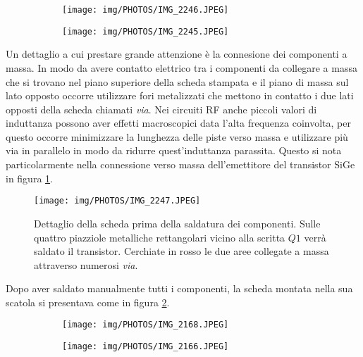 \documentclass[12pt,oneside]{book}
\begin{document}
\begin{figure}[!htbp]
    \centering
    \begin{subfigure}[t]{0.48\textwidth}
        \centering
        \texttt{[image: img/PHOTOS/IMG\_2246.JPEG]}
        \caption{}
    \end{subfigure}
    \hfill
    \begin{subfigure}[t]{0.48\textwidth}
        \centering
        \texttt{[image: img/PHOTOS/IMG\_2245.JPEG]}
        \caption{}
    \end{subfigure}
    \caption{}
\end{figure}

Un dettaglio a cui prestare grande attenzione è la connesione dei componenti a massa. In modo da avere contatto elettrico tra i componenti da collegare a massa che si trovano nel piano superiore della scheda stampata e il piano di massa sul lato opposto occorre utilizzare fori metalizzati che mettono in contatto i due lati opposti della scheda chiamati \textit{via}. Nei circuiti RF anche piccoli valori di induttanza possono aver effetti macroscopici data l'alta frequenza coinvolta, per questo occorre minimizzare la lunghezza delle piste verso massa e utilizzare più via in parallelo in modo da ridurre quest'induttanza parassita. Questo si nota particolarmente nella connessione verso massa dell'emettitore del transistor SiGe in figura \ref{sige_ground}.

\begin{figure}[!htbp]
    \centering

    \texttt{[image: img/PHOTOS/IMG\_2247.JPEG]}
    \caption{Dettaglio della scheda prima della saldatura dei componenti. Sulle quattro piazziole metalliche rettangolari vicino alla scritta $Q1$ verrà saldato il transistor. Cerchiate in rosso le due aree collegate a massa attraverso numerosi \textit{via}.}
    \label{sige_ground}
\end{figure}

Dopo aver saldato manualmente tutti i componenti, la scheda montata nella sua scatola si presentava come in figura \ref{scheda}.

\begin{figure}[!htbp]
    \centering
    \begin{subfigure}[t]{0.48\textwidth}
        \centering
        \texttt{[image: img/PHOTOS/IMG\_2168.JPEG]}
        \caption{}
    \end{subfigure}
    \hfill
    \begin{subfigure}[t]{0.48\textwidth}
        \centering
        \texttt{[image: img/PHOTOS/IMG\_2166.JPEG]}
        \caption{}
    \end{subfigure}
    \caption{}
    \label{scheda}
\end{figure}
\end{document}
